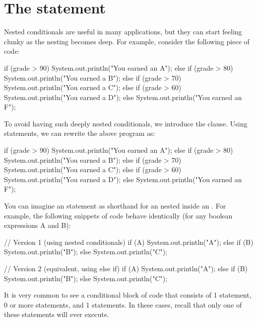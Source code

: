 \section{The  statement}
Nested conditionals are useful in many applications, but they can start feeling clunky as the nesting becomes deep. For example, consider the following piece of code:

\begin{code}
if (grade > 90) {
    System.out.println("You earned an A");
} else {
    if (grade > 80) {
        System.out.println("You earned a B");
    } else {
        if (grade > 70) {
            System.out.println("You earned a C");
        } else {
            if (grade > 60) {
                System.out.println("You earned a D");
            } else {
                System.out.println("You earned an F");
            }
        }
    }
}
\end{code}

To avoid having such deeply nested conditionals, we introduce the  clause. Using  statements, we can rewrite the above program as:

\begin{code}
if (grade > 90) {
    System.out.println("You earned an A");
} else if (grade > 80) {
    System.out.println("You earned a B");
} else if (grade > 70) {
    System.out.println("You earned a C");
} else if (grade > 60) {
    System.out.println("You earned a D");
} else {
    System.out.println("You earned an F");
}
\end{code}

You can imagine an  statement as shorthand for an  nested inside an . For example, the following snippets of code behave identically (for any boolean expressions A and B):

\begin{code}
// Version 1 (using nested conditionals)
if (A) {
    System.out.println("A");
} else {
    if (B) {
        System.out.println("B");
    } else {
        System.out.println("C");
    }
}

// Version 2 (equivalent, using else if)
if (A) {
    System.out.println("A");
} else if (B) {
    System.out.println("B");
} else {
    System.out.println("C");
}
\end{code}

It is very common to see a conditional block of code that consists of 1  statement, 0 or more  statements, and 1  statements. In these cases, recall that only one of these statements will ever execute.

